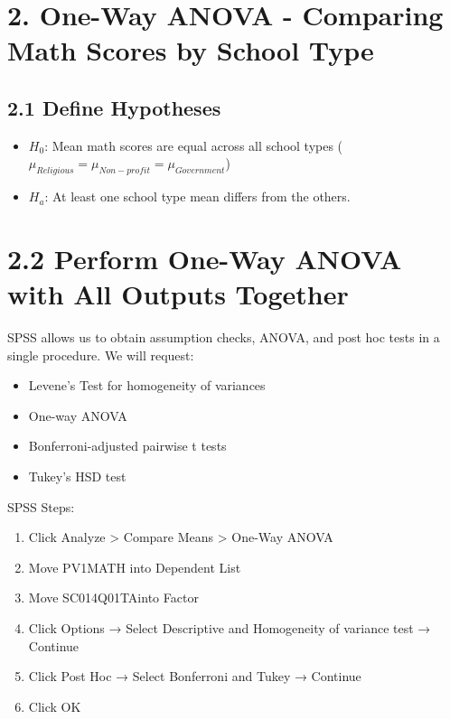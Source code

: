 \documentclass[
  letterpaper,
  DIV=11,
  numbers=noendperiod]{scrreprt}
\begin{document}
\section*{2. One-Way ANOVA - Comparing Math Scores by School
Type}\label{one-way-anova---comparing-math-scores-by-school-type}


\subsection*{2.1 Define Hypotheses}\label{define-hypotheses-1}

\begin{itemize}
\item
  \(H_0\): Mean math scores are equal across all school types
  (\(\mu_{Religious}=\mu_{Non−profit}=\mu_{Government}\))
\item
  \(H_a\): At least one school type mean differs from the others.
\end{itemize}

\section*{2.2 Perform One-Way ANOVA with All Outputs
Together}\label{perform-one-way-anova-with-all-outputs-together}


SPSS allows us to obtain assumption checks, ANOVA, and post hoc tests in
a single procedure. We will request:

\begin{itemize}
\item
  Levene's Test for homogeneity of variances
\item
  One-way ANOVA
\item
  Bonferroni-adjusted pairwise t tests
\item
  Tukey's HSD test
\end{itemize}

SPSS Steps:

\begin{enumerate}
\def\labelenumi{\arabic{enumi}.}
\item
  Click Analyze \textgreater{} Compare Means \textgreater{} One-Way
  ANOVA
\item
  Move PV1MATH into Dependent List
\item
  Move SC014Q01TAinto Factor
\item
  Click Options → Select Descriptive and Homogeneity of variance test →
  Continue
\item
  Click Post Hoc → Select Bonferroni and Tukey → Continue
\item
  Click OK
\end{enumerate}
\end{document}
